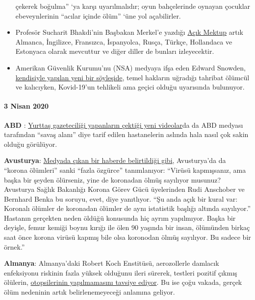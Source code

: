 \begin{itemize}
  çekerek boğulma'' `ya karşı uyarılmalıdır; oyun bahçelerinde oynayan
  çocuklar ebeveynlerinin ``acılar içinde ölüm'' `üne yol açabilirler.
\item
  Profesör Sucharit Bhakdi'nin Başbakan Merkel'e yazdığı
  \href{https://swprs.org/open-letter-from-professor-sucharit-bhakdi-to-german-chancellor-dr-angela-merkel/}{Açık
  Mektup} artık Almanca, İngilizce, Fransızca, İspanyolca, Rusça,
  Türkçe, Hollandaca ve Estonyaca olarak mevcuttur ve diğer diller de
  bunları izleyecektir. 
\item
  Amerikan Güvenlik Kurumu'nu (NSA) medyaya ifşa eden Edward Snowden,
  \href{https://www.youtube.com/watch?v=-pcQFTzck_c}{kendisiyle yapılan
  yeni bir söyleşide}, temel hakların uğradığı tahribat ölümcül ve
  kalıcıyken, Kovid-19'un tehlikeli ama geçici olduğu uyarısında
  bulunuyor.
\end{itemize}

\hypertarget{3-nisan-2020}{%
\paragraph{3 Nisan 2020}\label{3-nisan-2020}}

\textbf{ABD }:
\href{https://www.youtube.com/watch?v=5pIMD1enwd4}{Yurttaş gazeteciliği
yapanların çektiği yeni videolar}da da ABD medyası tarafından ``savaş
alanı'' diye tarif edilen hastanelerin aslında hala nasıl çok sakin
olduğu görülüyor.

\textbf{Avusturya}:
\href{https://www.heute.at/s/osterreich-bei-corona-todesstatistik-sehr-liberal-48665863}{Medyada
çıkan bir haberde belirtildiği gibi}, Avusturya'da da ``korona
ölümleri'' sanki ``fazla özgürce'' tanımlanıyor: ``Virüsü kapmışsanız,
ama başka bir şeyden ölürseniz, yine de koronadan ölmüş sayılıyor
musunuz? Avusturya Sağlık Bakanlığı Korona Görev Gücü üyelerinden Rudi
Anschober ve Bernhard Benka bu soruyu, evet, diye yanıtlıyor. ``Şu anda
açık bir kural var: Koronalı ölümler de koronadan ölümler de aynı
istatistik başlığı altında sayılıyor.'' Hastanın gerçekten neden öldüğü
konusunda hiç ayrım yapılmıyor. Başka bir deyişle, femur kemiği boynu
kırığı ile ölen 90 yaşında bir insan, ölümünden birkaç saat önce korona
virüsü kapmış bile olsa koronodan ölmüş sayılıyor. Bu sadece bir
örnek.''

\textbf{Almanya}: Almanya'daki Robert Koch Enstitüsü, aerozollerle
damlacık enfeksiyonu riskinin fazla yüksek olduğunu ileri sürerek,
testleri pozitif çıkmış ölülerin,
\href{https://www.youtube.com/watch?v=gSn_YaOYYcY}{otopsilerinin
yapılmamasını tavsiye ediyor}. Bu ise çoğu vakada, gerçek ölüm nedeninin
artık belirlenemeyeceği anlamına geliyor.

